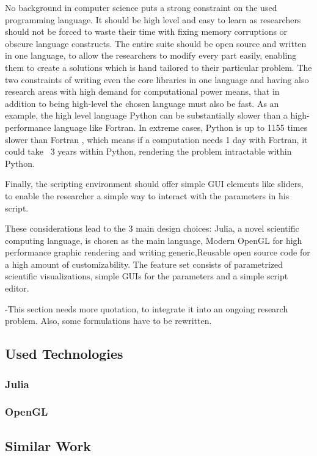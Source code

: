 No background in computer science puts a strong constraint on the used programming language. It should be high level and easy to learn as researchers should not be forced to waste their time with fixing memory corruptions or obscure language constructs.
The entire suite should be open source and written in one language, to allow the researchers to modify every part easily, enabling them to create a solutions which is hand tailored to their particular problem.
The two constraints of writing even the core libraries in one language and having also research areas with high demand for computational power means, that in addition to being high-level the chosen language must also be fast.
As an example, the high level language Python can be substantially slower than a high-performance language like Fortran.
In extreme cases, Python is up to 1155 times slower than Fortran \cite{benchmark_python}, which means if a computation needs 1 day with Fortran, it could take ~3 years within Python, rendering the problem intractable within Python.

Finally, the scripting environment should offer simple GUI elements like sliders, to enable the researcher a simple way to interact with the parameters in his script.

These considerations lead to the 3 main design choices:
Julia, a novel scientific computing language, is chosen as the main language, Modern OpenGL for high performance graphic rendering and writing generic,Reusable open source code for a high amount of customizability.
The feature set consists of parametrized scientific visualizations, simple GUIs for the parameters and a simple script editor.

-This section needs more quotation, to integrate it into an ongoing research problem. Also, some formulations have to be rewritten.
\pagebreak

\subsection{Used Technologies}

\subsubsection{Julia}
\subsubsection{OpenGL}


\subsection{Similar Work}

